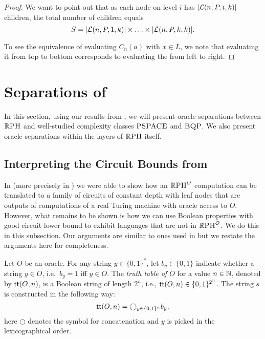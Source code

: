 \documentclass{article}
\begin{document}
\begin{proof}
We want to point out that as each node on level $i$ has $|\mathcal{L}(n,P,i,k)|$ children, the total number of children equals 
\[S = |\mathcal{L}(n,P,1,k)| \times \ldots \times |\mathcal{L}(n,P,k,k)|.\]

To see the equivalence of evaluating $C_n(a)$ with $x\in L$,
we note that evaluating it from top to bottom 
corresponds to evaluating the  from left to right.

\end{proof}

\section{Separations of \RPH}
\label{sec:RPHSeparations}

In this section, using our results from , we will present oracle separations between $\mathbb{R}\textsc{PH}$ and well-studied complexity classes $\textsc{PSPACE}$ and $\textsc{BQP}$. We also present oracle separations within the layers of $\mathbb{R}\textsc{PH}$ itself. 

\subsection{Interpreting the Circuit Bounds from }
\label{sub:InterpretationCircuitUpperBounds}

In  (more precisely in ) we were able to show how an $\mathbb{R}\textsc{PH}^O$ computation can be translated to a family of circuits of constant depth with leaf nodes that are outputs of computations of a real Turing machine with oracle access to $O$. However, what remains to be shown is how we can use Boolean properties with good circuit lower bound to exhibit languages that are not in $\mathbb{R}\textsc{PH}^O$. We do this in this subsection. Our arguments are similar to ones used in \cite{FSS84,Cai86} but we restate the arguments here for completeness.

\begin{definition} 
\label{def:TruthTableOfO}
Let $O$ be an oracle. For any string $y\in \{0,1\}^*$, let $b_y \in \{0,1\}$ indicate whether a string $y \in O$, i.e.\ $b_y=1$ iff $y\in O$. The \emph{truth table of $O$} for a value $n \in \mathbb{N}$, denoted by $\textsf{tt}(O,n)$, 
is a Boolean string of length $2^n$,
i.e., $\textsf{tt}(O,n) \in \{0,1\}^{2^n}$.
The string $s$ is
constructed in the following way:
\begin{equation*}
    \textsf{tt}(O,n)=\bigcirc_{y \in \{0,1\}^n} b_y,
\end{equation*}
here $\bigcirc$ denotes the symbol for concatenation and $y$ is picked in the lexicographical order.
\end{definition}
\end{document}
